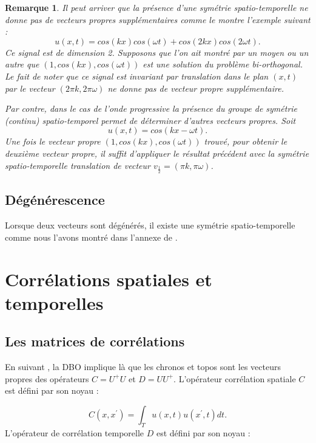 \documentclass{book}
\newtheorem{rem}{Remarque}[chapter]
\begin{document}
\begin{rem}
Il peut arriver que la pr\'esence d'une sym\'etrie spatio-temporelle
ne donne pas de vecteurs propres suppl\'ementaires comme le montre
l'exemple suivant :
\begin{equation}
u(x,t)=cos(kx)cos(\omega t)+cos(2kx)cos(2\omega t).
\end{equation}
Ce signal est de dimension 2. Supposons que l'on
ait montr\'e par un moyen ou un autre  que $(1,cos(kx),cos(\omega t))$ 
est une solution du probl\`eme bi-orthogonal.
Le fait de noter que
ce signal est invariant par translation dans le
plan $(x,t)$ par le  vecteur $(2\pi k, 2\pi\omega )$ ne donne pas
de vecteur propre suppl\'ementaire.

Par contre, dans le cas de l'onde progressive
la pr\'esence du groupe de sym\'etrie (continu) spatio-temporel 
permet de d\'eterminer d'autres vecteurs propres.
Soit
\begin{equation}
u(x,t)=cos(kx-\omega t).
\end{equation}
Une fois le vecteur propre  $(1,cos(kx),cos(\omega t))$ 
trouv\'e, pour obtenir le deuxi\`eme vecteur propre,
il suffit d'appliquer le r\'esultat pr\'ec\'edent avec la sym\'etrie
spatio-temporelle translation de vecteur 
$v_{\frac{1}{2}}=(\pi k,\pi \omega)$.
\end{rem}

\subsection{D\'eg\'en\'erescence}
Lorsque deux vecteurs sont d\'eg\'en\'er\'es, il existe une sym\'etrie 
spatio-temporelle comme nous l'avons montr\'e dans l'annexe de
\cite{Madon96b}.


\section{Corr\'elations spatiales et temporelles}
\subsection{Les matrices de corr\'elations}
En suivant \cite{Guyonnet91}, la DBO implique l\`a
que les chronos et topos sont les vecteurs
propres 
des op\'erateurs $C=U^+U$ et $D=UU^+$.
L'op\'erateur corr\'elation spatiale
$C$ est d\'efini par son noyau :

\begin{equation}
C(x,x^\prime)=\int_Tu(x,t)u(x^\prime,t)dt.
\end{equation}
L'op\'erateur de corr\'elation temporelle
$D$ est d\'efini par son noyau :
\end{document}

